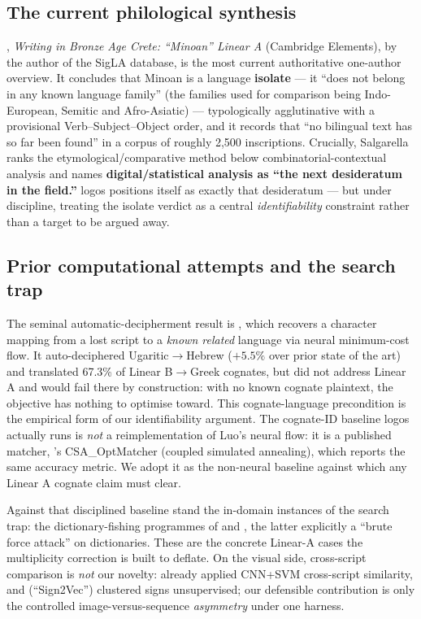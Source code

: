 \subsection{The current philological synthesis}

\citet{salgarella2025}, \emph{Writing in Bronze Age Crete: ``Minoan''
Linear A} (Cambridge Elements), by the author of the SigLA database, is
the most current authoritative one-author overview. It concludes that
Minoan is a language \textbf{isolate} --- it ``does not belong in any
known language family'' (the families used for comparison being
Indo-European, Semitic and Afro-Asiatic) --- typologically agglutinative
with a provisional Verb--Subject--Object order, and it records that ``no
bilingual text has so far been found'' in a corpus of roughly 2,500
inscriptions. Crucially, Salgarella ranks the etymological/comparative
method below combinatorial-contextual analysis and names
\textbf{digital/statistical analysis as ``the next desideratum in the
field.''} logos positions itself as exactly that desideratum --- but
under discipline, treating the isolate verdict as a central
\emph{identifiability} constraint rather than a target to be argued away.

\subsection{Prior computational attempts and the search trap}

The seminal automatic-decipherment result is \citet{luo2019}, which
recovers a character mapping from a lost script to a \emph{known related}
language via neural minimum-cost flow. It auto-deciphered
Ugaritic$\rightarrow$Hebrew ($+5.5\%$ over prior state of the art) and
translated 67.3\% of Linear B$\rightarrow$Greek cognates, but did not
address Linear A and would fail there by construction: with no known
cognate plaintext, the objective has nothing to optimise toward. This
cognate-language precondition is the empirical form of our
identifiability argument. The cognate-ID baseline logos actually runs is
\emph{not} a reimplementation of Luo's neural flow: it is a published
matcher, \citeauthor{tamburini2025}'s \citeyearpar{tamburini2025}
CSA\_OptMatcher (coupled simulated annealing), which reports the same
\citet{luo2019} accuracy metric. We adopt it as the non-neural baseline
against which any Linear A cognate claim must clear.

Against that disciplined baseline stand the in-domain instances of the
search trap: the dictionary-fishing programmes of \citet{eu2019} and
\citet{loh2020}, the latter explicitly a ``brute force attack'' on
dictionaries. These are the concrete Linear-A cases the multiplicity
correction is built to deflate. On the visual side, cross-script
comparison is \emph{not} our novelty: \citet{daggumati2019, daggumati2023}
already applied CNN+SVM cross-script similarity, and \citet{corazza2022}
(``Sign2Vec'') clustered signs unsupervised; our defensible contribution
is only the controlled image-versus-sequence \emph{asymmetry} under one
harness.

